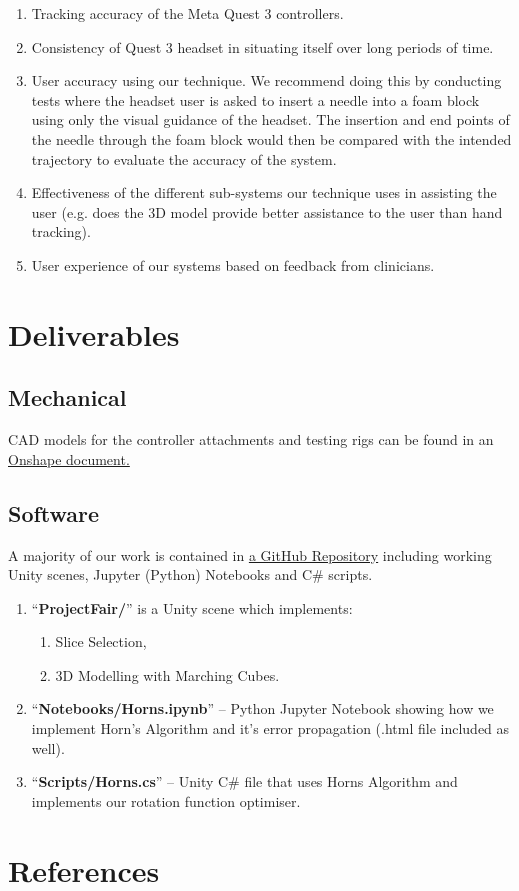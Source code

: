 \documentclass[12pt]{article}
\begin{document}
\begin{enumerate}
    \item Tracking accuracy of the Meta Quest 3 controllers.
    \item Consistency of Quest 3 headset in situating itself over long periods of time.
    \item User accuracy using our technique. We recommend doing this by conducting tests where the headset user is asked to insert a needle into a foam block using only the visual guidance of the headset. The insertion and end points of the needle through the foam block would then be compared with the intended trajectory to evaluate the accuracy of the system.
    \item Effectiveness of the different sub-systems our technique uses in assisting the user (e.g. does the 3D model provide better assistance to the user than hand tracking).
    \item User experience of our systems based on feedback from clinicians. 
\end{enumerate}
\section{Deliverables}
\subsection{Mechanical}
CAD models for the controller attachments and testing rigs can be found in an \href{https://cad.onshape.com/documents/a7669772db1e8cf42f0d84d7/w/a372f52852661928ae6b39d4/e/6cbc84bf2eabff7db7f6d995?renderMode=0&uiState=661c9dc0dc1f8708bbbcbccf}{Onshape document.}
\subsection{Software}
A majority of our work is contained in \href{https://github.com/okim1227/AR-Spinal-Injection.git}{\underline{a GitHub Repository}} including working Unity scenes, Jupyter (Python) Notebooks and C\# scripts.
\begin{enumerate}
    \item ``\textbf{ProjectFair/}'' is a Unity scene which implements:
      \begin{enumerate}[label=\alph*.]
    \item Slice Selection,
    \item 3D Modelling with Marching Cubes.
  \end{enumerate}
  \item ``\textbf{Notebooks/Horns.ipynb}'' -- Python Jupyter Notebook showing how we implement Horn's Algorithm and it's error propagation (.html file included as well). 
  \item ``\textbf{Scripts/Horns.cs}'' -- Unity C\# file that uses Horns Algorithm and implements our rotation function optimiser.
\end{enumerate}
\section{References}
\printbibliography
\end{document}
